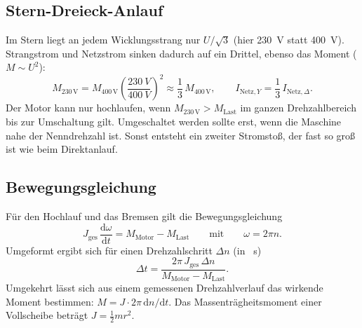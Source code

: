 \documentclass[11pt,a4paper]{article}
\begin{document}
\subsection{Stern-Dreieck-Anlauf}
Im Stern liegt an jedem Wicklungsstrang nur $U/\sqrt3$ (hier \SI{230}{V} statt \SI{400}{V}).
Strangstrom und Netzstrom sinken dadurch auf ein Drittel, ebenso das Moment
($M\sim U^2$):
\begin{equation}
  M_{230\,\mathrm V} = M_{400\,\mathrm V}\left(\frac{\SI{230}{V}}{\SI{400}{V}}\right)^2
  \approx \frac13\,M_{400\,\mathrm V},\qquad
  I_{\mathrm{Netz},Y} = \frac13\, I_{\mathrm{Netz},\Delta}.
  \label{eq:stern}
\end{equation}
Der Motor kann nur hochlaufen, wenn $M_{230\,\mathrm V} > M_\mathrm{Last}$ im ganzen
Drehzahlbereich bis zur Umschaltung gilt. Umgeschaltet werden sollte erst, wenn die
Maschine nahe der Nenndrehzahl ist. Sonst entsteht ein zweiter Stromstoß, der
fast so groß ist wie beim Direktanlauf.

\subsection{Bewegungsgleichung}
Für den Hochlauf und das Bremsen gilt die Bewegungsgleichung
\begin{equation}
  J_\mathrm{ges}\,\frac{\mathrm d\omega}{\mathrm dt} = M_\mathrm{Motor} - M_\mathrm{Last}
  \qquad\text{mit}\qquad \omega = 2\pi n .
  \label{eq:bewegung}
\end{equation}
Umgeformt ergibt sich für einen Drehzahlschritt $\Delta n$ (in \si{\per\second})
\begin{equation}
  \Delta t = \frac{2\pi\,J_\mathrm{ges}\,\Delta n}{M_\mathrm{Motor}-M_\mathrm{Last}} .
  \label{eq:dt}
\end{equation}
Umgekehrt lässt sich aus einem gemessenen Drehzahlverlauf das wirkende Moment
bestimmen: $M = J\cdot 2\pi\,\mathrm dn/\mathrm dt$. Das Massenträgheitsmoment
einer Vollscheibe beträgt $J = \tfrac12 m r^2$.
\end{document}
